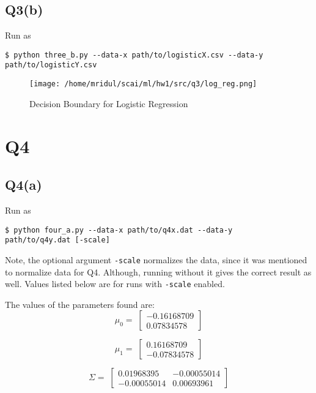\documentclass[11pt]{article}
\begin{document}
\subsection{Q3(b)}
\label{sec:orgeaf4eb5}
\begin{codebox}
Run as
\begin{verbatim}
$ python three_b.py --data-x path/to/logisticX.csv --data-y
path/to/logisticY.csv
\end{verbatim}
\end{codebox}
\begin{figure}[!ht]
\centering
\texttt{[image: /home/mridul/scai/ml/hw1/src/q3/log\_reg.png]}
\caption{\label{fig:org09442ad}Decision Boundary for Logistic Regression}
\end{figure}
\clearpage
\section{Q4}
\label{sec:orgfd67199}
\subsection{Q4(a)}
\label{sec:orgc60505f}
\begin{codebox}
Run as
\begin{verbatim}
$ python four_a.py --data-x path/to/q4x.dat --data-y
path/to/q4y.dat [-scale]
\end{verbatim}
Note, the optional argument \verb|-scale| normalizes the
data, since it was mentioned to normalize data for Q4.
Although, running without it gives the correct result as
well. Values listed below are for runs with \verb|-scale|
enabled.
\end{codebox}
The values of the parameters found are:
\begin{equation*}
\mu_0 = \;
\begin{bmatrix}
-0.16168709\\
0.07834578
\end{bmatrix}
\end{equation*}

\begin{equation*}
\mu_1 = \;
\begin{bmatrix}
0.16168709\\
-0.07834578
\end{bmatrix}
\end{equation*}

\begin{equation*}
\Sigma = \;
\begin{bmatrix}
0.01968395& -0.00055014\\
-0.00055014&  0.00693961
\end{bmatrix}
\end{equation*}
\end{document}
